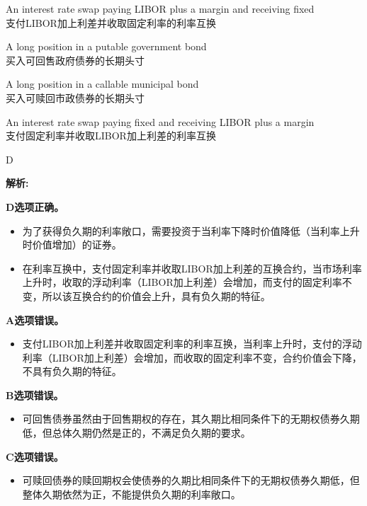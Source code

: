 \documentclass{article}
\newenvironment{explanation}
{\textbf{解析:}\par}
{\par}
\begin{document}
    \begin{choices}
        \item An interest rate swap paying LIBOR plus a margin and receiving fixed\\
        支付LIBOR加上利差并收取固定利率的利率互换
        \item A long position in a putable government bond\\
        买入可回售政府债券的长期头寸
        \item A long position in a callable municipal bond\\
        买入可赎回市政债券的长期头寸
        \item An interest rate swap paying fixed and receiving LIBOR plus a margin\\
        支付固定利率并收取LIBOR加上利差的利率互换
    \end{choices}
    
    \begin{correctanswer}
        D
    \end{correctanswer}
    
    \begin{explanation}
    \textbf{D选项正确。}
    \begin{itemize}
        \item 为了获得负久期的利率敞口，需要投资于当利率下降时价值降低（当利率上升时价值增加）的证券。
        \item 在利率互换中，支付固定利率并收取LIBOR加上利差的互换合约，当市场利率上升时，收取的浮动利率（LIBOR加上利差）会增加，而支付的固定利率不变，所以该互换合约的价值会上升，具有负久期的特征。
    \end{itemize}
    \textbf{A选项错误。}
    \begin{itemize}
        \item 支付LIBOR加上利差并收取固定利率的利率互换，当利率上升时，支付的浮动利率（LIBOR加上利差）会增加，而收取的固定利率不变，合约价值会下降，不具有负久期的特征。
    \end{itemize}
    \textbf{B选项错误。}
    \begin{itemize}
        \item 可回售债券虽然由于回售期权的存在，其久期比相同条件下的无期权债券久期低，但总体久期仍然是正的，不满足负久期的要求。
    \end{itemize}
    \textbf{C选项错误。}
    \begin{itemize}
        \item 可赎回债券的赎回期权会使债券的久期比相同条件下的无期权债券久期低，但整体久期依然为正，不能提供负久期的利率敞口。
    \end{itemize}
    \end{explanation}
    
\end{document}
